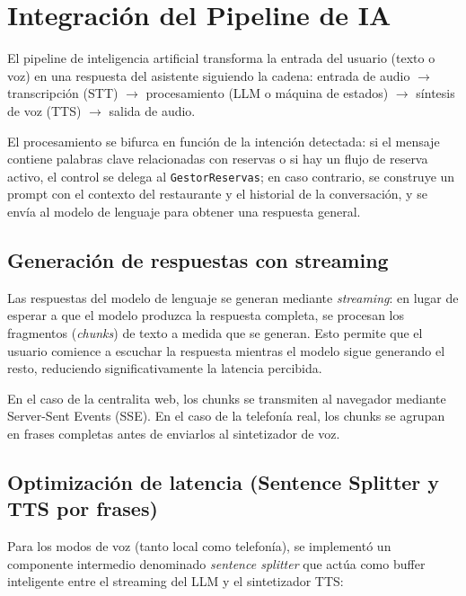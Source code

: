 \section{Integración del Pipeline de IA}
\label{sec:integracion_pipeline_ia}

El pipeline de inteligencia artificial transforma la entrada del usuario (texto o voz) en una respuesta del asistente siguiendo la cadena: entrada de audio $\rightarrow$ transcripción (STT) $\rightarrow$ procesamiento (LLM o máquina de estados) $\rightarrow$ síntesis de voz (TTS) $\rightarrow$ salida de audio.


El procesamiento se bifurca en función de la intención detectada: si el mensaje contiene palabras clave relacionadas con reservas o si hay un flujo de reserva activo, el control se delega al \texttt{GestorReservas}; en caso contrario, se construye un prompt con el contexto del restaurante y el historial de la conversación, y se envía al modelo de lenguaje para obtener una respuesta general.

\subsection{Generación de respuestas con streaming}
\label{subsec:streaming_llm}

Las respuestas del modelo de lenguaje se generan mediante \textit{streaming}: en lugar de esperar a que el modelo produzca la respuesta completa, se procesan los fragmentos (\textit{chunks}) de texto a medida que se generan. Esto permite que el usuario comience a escuchar la respuesta mientras el modelo sigue generando el resto, reduciendo significativamente la latencia percibida.

En el caso de la centralita web, los chunks se transmiten al navegador mediante Server-Sent Events (SSE). En el caso de la telefonía real, los chunks se agrupan en frases completas antes de enviarlos al sintetizador de voz.

\subsection{Optimización de latencia (Sentence Splitter y TTS por frases)}
\label{subsec:optimizacion_latencia}

Para los modos de voz (tanto local como telefonía), se implementó un componente intermedio denominado \textit{sentence splitter} que actúa como buffer inteligente entre el streaming del LLM y el sintetizador TTS:

